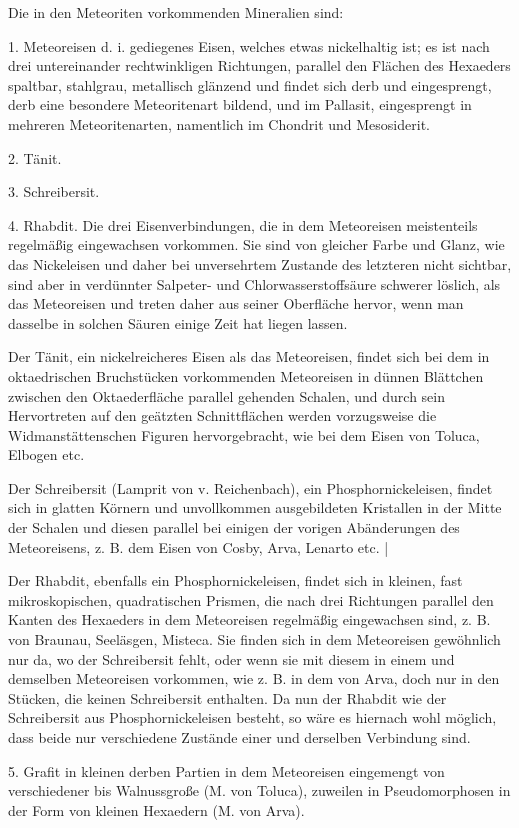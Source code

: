\documentclass[a4paper, 11pt, oneside]{article}
\begin{document}
Die in den Meteoriten vorkommenden Mineralien sind:

1. Meteoreisen d. i. gediegenes Eisen, welches etwas nickelhaltig ist; es ist nach drei untereinander rechtwinkligen Richtungen, parallel den Flächen des Hexaeders spaltbar, stahlgrau, metallisch glänzend und findet sich derb und eingesprengt, derb eine besondere Meteoritenart bildend, und im Pallasit, eingesprengt in mehreren Meteoritenarten, namentlich im Chondrit und Mesosiderit.

2. Tänit.

3. Schreibersit.

4. Rhabdit. Die drei Eisenverbindungen, die in dem Meteoreisen meistenteils regelmäßig eingewachsen vorkommen. Sie sind von gleicher Farbe und Glanz, wie das Nickeleisen und daher bei unversehrtem Zustande des letzteren nicht sichtbar, sind aber in verdünnter Salpeter- und Chlorwasserstoffsäure schwerer löslich, als das Meteoreisen und treten daher aus seiner Oberfläche hervor, wenn man dasselbe in solchen Säuren einige Zeit hat liegen lassen.

Der Tänit, ein nickelreicheres Eisen als das Meteoreisen, findet sich bei dem in oktaedrischen Bruchstücken vorkommenden Meteoreisen in dünnen Blättchen zwischen den Oktaederfläche parallel gehenden Schalen, und durch sein Hervortreten auf den geätzten Schnittflächen werden vorzugsweise die Widmanstättenschen Figuren hervorgebracht, wie bei dem Eisen von Toluca, Elbogen etc.

Der Schreibersit (Lamprit von v. Reichenbach), ein Phosphornickeleisen, findet sich in glatten Körnern und unvollkommen ausgebildeten Kristallen in der Mitte der Schalen und diesen parallel bei einigen der vorigen Abänderungen des Meteoreisens, z. B. dem Eisen von Cosby, Arva, Lenarto etc. |

Der Rhabdit, ebenfalls ein Phosphornickeleisen, findet sich in kleinen, fast mikroskopischen, quadratischen Prismen, die nach drei Richtungen parallel den Kanten des Hexaeders in dem Meteoreisen regelmäßig eingewachsen sind, z. B. von Braunau, Seeläsgen, Misteca. Sie finden sich in dem Meteoreisen gewöhnlich nur da, wo der Schreibersit fehlt, oder wenn sie mit diesem in einem und demselben Meteoreisen vorkommen, wie z. B. in dem von Arva, doch nur in den Stücken, die keinen Schreibersit enthalten. Da nun der Rhabdit wie der Schreibersit aus Phosphornickeleisen besteht, so wäre es hiernach wohl möglich, dass beide nur verschiedene Zustände einer und derselben Verbindung sind.

5. Grafit in kleinen derben Partien in dem Meteoreisen eingemengt von verschiedener bis Walnussgroße (M. von Toluca), zuweilen in Pseudomorphosen in der Form von kleinen Hexaedern (M. von Arva).
\end{document}
